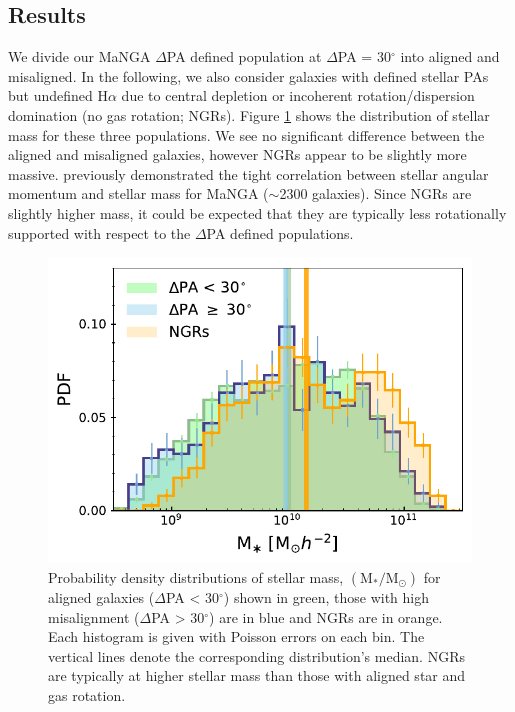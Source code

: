 \subsection{Results} \label{sec:results_obs}
We divide our MaNGA $\Delta$PA defined population at $\Delta$PA = 30$^{\circ}$ into aligned and misaligned. In the following, we also consider galaxies with defined stellar PAs but undefined H$\alpha$ due to central depletion or incoherent rotation/dispersion domination (no gas rotation; NGRs). Figure \ref{fig:delPA_stelM} shows the distribution of stellar mass for these three populations. We see no significant difference between the aligned and misaligned galaxies, however NGRs appear to be slightly more massive. \citet{graham2018} previously demonstrated the tight correlation between stellar angular momentum and stellar mass for MaNGA ($\sim$2300 galaxies). Since NGRs are slightly higher mass, it could be expected that they are typically less rotationally supported with respect to the $\Delta$PA defined populations. 

\begin{figure}
    \centering
	\includegraphics[width=0.7\linewidth]{thesis/latex/misalignment_MaNGA/delPA_stelM.pdf}
    \caption{Probability density distributions of stellar mass, $\mathrm{(M_{\ast}/M_{\odot})}$ for aligned galaxies ($\Delta$PA < 30$^{\circ}$) shown in green, those with high misalignment ($\Delta$PA > 30$^{\circ}$) are in blue and NGRs are in orange. Each histogram is given with Poisson errors on each bin. The vertical lines denote the corresponding distribution's median. NGRs are typically at higher stellar mass than those with aligned star and gas rotation.}
    \label{fig:delPA_stelM}
\end{figure}

